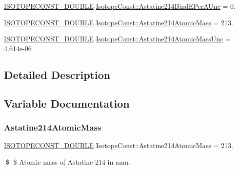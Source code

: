 \begin{DoxyCompactItemize}
\mbox{\hyperlink{group___isotope_const-_macros_ga8f45a7272ce02c0b4c65c44636ed719a}{I\+S\+O\+T\+O\+P\+E\+C\+O\+N\+S\+T\+\_\+\+D\+O\+U\+B\+LE}} \mbox{\hyperlink{group___isotope_const-_astatine-_at214_gae0bd2e929744300f421899dc2a0efd1b}{Isotope\+Const\+::\+Astatine214\+Bind\+E\+Per\+A\+Unc}} = 0.
\item 
\mbox{\hyperlink{group___isotope_const-_macros_ga8f45a7272ce02c0b4c65c44636ed719a}{I\+S\+O\+T\+O\+P\+E\+C\+O\+N\+S\+T\+\_\+\+D\+O\+U\+B\+LE}} \mbox{\hyperlink{group___isotope_const-_astatine-_at214_ga2f388b753c24fbcb200e85e6385f2ed2}{Isotope\+Const\+::\+Astatine214\+Atomic\+Mass}} = 213.
\item 
\mbox{\hyperlink{group___isotope_const-_macros_ga8f45a7272ce02c0b4c65c44636ed719a}{I\+S\+O\+T\+O\+P\+E\+C\+O\+N\+S\+T\+\_\+\+D\+O\+U\+B\+LE}} \mbox{\hyperlink{group___isotope_const-_astatine-_at214_ga9ae1dccaa45fbae1025830c275690b8f}{Isotope\+Const\+::\+Astatine214\+Atomic\+Mass\+Unc}} = 4.\+614e-\/06
\end{DoxyCompactItemize}


\subsection{Detailed Description}


\subsection{Variable Documentation}
\mbox{\label{group___isotope_const-_astatine-_at214_ga2f388b753c24fbcb200e85e6385f2ed2}} 
\subsubsection{\texorpdfstring{Astatine214\+Atomic\+Mass}{Astatine214AtomicMass}}
{\footnotesize\ttfamily \mbox{\hyperlink{group___isotope_const-_macros_ga8f45a7272ce02c0b4c65c44636ed719a}{I\+S\+O\+T\+O\+P\+E\+C\+O\+N\+S\+T\+\_\+\+D\+O\+U\+B\+LE}} Isotope\+Const\+::\+Astatine214\+Atomic\+Mass = 213.}

\$ \$ Atomic mass of Astatine-\/214 in amu. \mbox{\label{group___isotope_const-_astatine-_at214_ga9ae1dccaa45fbae1025830c275690b8f}} 
